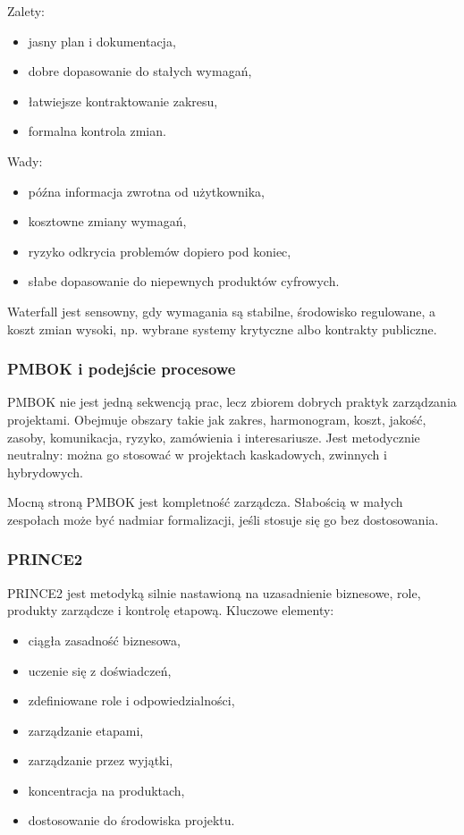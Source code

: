 Zalety:
\begin{itemize}
  \item jasny plan i dokumentacja,
  \item dobre dopasowanie do stałych wymagań,
  \item łatwiejsze kontraktowanie zakresu,
  \item formalna kontrola zmian.
\end{itemize}

Wady:
\begin{itemize}
  \item późna informacja zwrotna od użytkownika,
  \item kosztowne zmiany wymagań,
  \item ryzyko odkrycia problemów dopiero pod koniec,
  \item słabe dopasowanie do niepewnych produktów cyfrowych.
\end{itemize}

Waterfall jest sensowny, gdy wymagania są stabilne, środowisko regulowane, a koszt zmian wysoki, np. wybrane systemy krytyczne albo kontrakty publiczne.

\subsubsection{PMBOK i podejście procesowe}

PMBOK nie jest jedną sekwencją prac, lecz zbiorem dobrych praktyk zarządzania projektami. Obejmuje obszary takie jak zakres, harmonogram, koszt, jakość, zasoby, komunikacja, ryzyko, zamówienia i interesariusze. Jest metodycznie neutralny: można go stosować w projektach kaskadowych, zwinnych i hybrydowych.

Mocną stroną PMBOK jest kompletność zarządcza. Słabością w małych zespołach może być nadmiar formalizacji, jeśli stosuje się go bez dostosowania.

\subsubsection{PRINCE2}

PRINCE2 jest metodyką silnie nastawioną na uzasadnienie biznesowe, role, produkty zarządcze i kontrolę etapową. Kluczowe elementy:
\begin{itemize}
  \item ciągła zasadność biznesowa,
  \item uczenie się z doświadczeń,
  \item zdefiniowane role i odpowiedzialności,
  \item zarządzanie etapami,
  \item zarządzanie przez wyjątki,
  \item koncentracja na produktach,
  \item dostosowanie do środowiska projektu.
\end{itemize}

